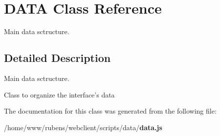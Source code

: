 \section{DATA Class Reference}
\label{classDATA}
Main data sctructure.  




\subsection{Detailed Description}
Main data sctructure. 

Class to organize the interface's data 

The documentation for this class was generated from the following file:\begin{CompactItemize}
\item 
/home/www/rubens/webclient/scripts/data/{\bf data.js}\end{CompactItemize}
